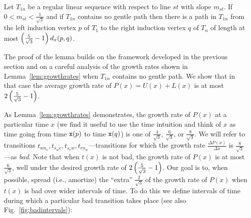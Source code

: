\begingroup
\def\thetheorem{\ref{le:mainlemmaB}}
\begin{lemma}
Let $T_{1n}$ be a regular linear sequence with respect to line $st$ with slope
$m_{st}$. If $0 < m_{st} < \frac{1}{\sqrt{3}}$ and if $T_{1n}$ contains no
gentle path then there is a path in $T_{1n}$ from 
the left induction vertex $p$ of $T_1$ to the right induction vertex $q$ of
$T_n$ of length at most  $\left(\frac{5}{\sqrt{3}}-1\right) d_x(p,q)$.
\end{lemma}
\addtocounter{theorem}{-1}
\endgroup

The proof of the lemma builds on the framework developed in the previous
section and on a careful analysis of the growth rates shown in
Lemma~\ref{lem:growthrates} when $T_{1n}$ contains no gentle path. 
We show that in that case
the average growth rate of $P(x)=U(x)+L(x)$ is at most $2\left(\frac{5}{\sqrt{3}}-1\right)$.

As Lemma~\ref{lem:growthrates} demonstrates, the growth rate of $P(x)$ at a
particular time $x$ (we find it useful to use the time intuition and think of
$x$ as time going from time ${\tt x}(p)$ to time ${\tt x}(q)$) 
is one of $\frac{4}{\sqrt{3}}$, $\frac{6}{\sqrt{3}}$, or
$\frac{8}{\sqrt{3}}$. We will refer to transitions 
$t_{wn_e},t_{s_we},t_{s_ew},t_{en_w}$---transitions for which
the growth rate $\frac{\Delta P(x)}{\Delta x}$ is $\frac{8}{\sqrt{3}}$---as
{\em bad}. Note that when $t(x)$ is not bad, the growth rate of $P(x)$ is at
most $\frac{6}{\sqrt{3}}$, well under the desired growth rate of $2\left(\frac{5}{\sqrt{3}}-1\right)$. 
Our goal is to, when possible, spread (i.e., amortize) the 
``extra'' $\frac{2}{\sqrt{3}}$ of the growth rate
of $P(x)$ when $t(x)$ is bad over wider intervals of time. %
To do this we define intervals of time
during which a particular bad transition takes place %
(see also Fig.~\ref{fig:badintervals}):


